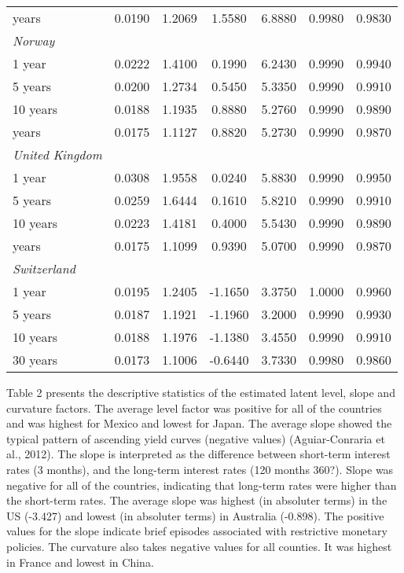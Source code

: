 \documentclass{article}
\begin{document}
\begin{table}[H]
\begin{tabular}{l c c c c c c}
\medskip													
30 years	&	0.0190	&	1.2069	&	1.5580	&	6.8880	&	0.9980	&	0.9830	\\
\textit{Norway}	&		&		&		&		&		&		\\
1 year	&	0.0222	&	1.4100	&	0.1990	&	6.2430	&	0.9990	&	0.9940	\\
5 years	&	0.0200	&	1.2734	&	0.5450	&	5.3350	&	0.9990	&	0.9910	\\
10 years	&	0.0188	&	1.1935	&	0.8880	&	5.2760	&	0.9990	&	0.9890	\\
\medskip													
30 years	&	0.0175	&	1.1127	&	0.8820	&	5.2730	&	0.9990	&	0.9870	\\
\textit{United Kingdom}	&		&		&		&		&		&		\\
1 year	&	0.0308	&	1.9558	&	0.0240	&	5.8830	&	0.9990	&	0.9950	\\
5 years	&	0.0259	&	1.6444	&	0.1610	&	5.8210	&	0.9990	&	0.9910	\\
10 years	&	0.0223	&	1.4181	&	0.4000	&	5.5430	&	0.9990	&	0.9890	\\
\medskip													
30 years	&	0.0175	&	1.1099	&	0.9390	&	5.0700	&	0.9990	&	0.9870	\\
\textit{Switzerland}	&		&		&		&		&		&		\\
1 year	&	0.0195	&	1.2405	&	-1.1650	&	3.3750	&	1.0000	&	0.9960	\\
5 years	&	0.0187	&	1.1921	&	-1.1960	&	3.2000	&	0.9990	&	0.9930	\\
10 years	&	0.0188	&	1.1976	&	-1.1380	&	3.4550	&	0.9990	&	0.9910	\\
30 years	&	0.0173	&	1.1006	&	-0.6440	&	3.7330	&	0.9980	&	0.9860	\\

\hline%
\end{tabular}
\label{table:nonlin}%
\end{table}

\bigskip

Table 2 presents the descriptive statistics of the estimated latent level, slope and curvature factors. The average level factor was positive for all of the countries and was highest for Mexico and lowest for Japan. The average slope showed the typical pattern of ascending yield curves (negative values) (Aguiar-Conraria et al., 2012). The slope is interpreted as the difference between short-term interest rates (3 months), and the long-term interest rates (120 months 360?). Slope was negative for all of the countries, indicating that long-term rates were higher than the short-term rates. The average slope was highest (in absoluter terms) in the US (-3.427) and lowest (in absoluter terms) in Australia (-0.898). The positive values for the slope indicate brief episodes associated with restrictive monetary policies.
The curvature also takes negative values for all counties. It was highest in France and lowest in China. 
\end{document}
